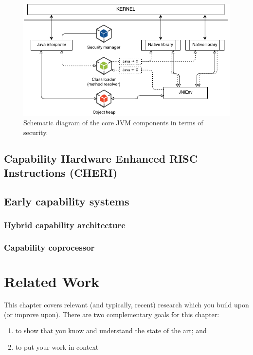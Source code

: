 \documentclass[a4paper,12pt,twoside,openright]{report}
\begin{document}
\begin{figure}
	\includegraphics[width=\textwidth]{dia_jni_orig.pdf}
	\caption{Schematic diagram of the core JVM components in terms of security.}
\end{figure}

\section{Capability Hardware Enhanced RISC Instructions (CHERI)}

\section{Early capability systems}

\subsection{Hybrid capability architecture}

\subsection{Capability coprocessor}

\chapter{Related Work} 

This chapter covers relevant (and typically, recent) research 
which you build upon (or improve upon). There are two complementary 
goals for this chapter: 
\begin{enumerate} 
  \item to show that you know and understand the state of the art; and 
  \item to put your work in context
\end{enumerate} 
\end{document}
